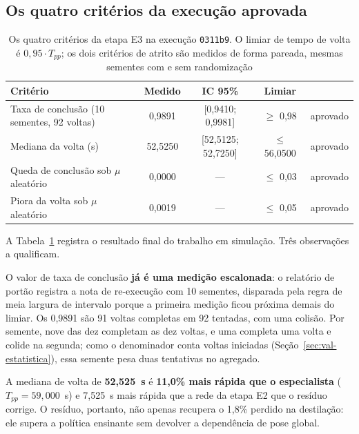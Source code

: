 \subsection{Os quatro critérios da execução aprovada}

\begin{table}[h]
    \centering
    \small
    \begin{tabularx}{\textwidth}{|>{\raggedright\arraybackslash}X|c|c|c|c|}
        \hline
        \textbf{Critério} & \textbf{Medido} & \textbf{IC 95\%} &
        \textbf{Limiar} & \\
        \hline
        Taxa de conclusão (10 sementes, 92 voltas) & 0,9891 &
        [0,9410; 0,9981] & $\geq$ 0,98 & aprovado \\
        \hline
        Mediana da volta (s) & 52,5250 & [52,5125; 52,7250] &
        $\leq$ 56,0500 & aprovado \\
        \hline
        Queda de conclusão sob $\mu$ aleatório & 0,0000 & --- &
        $\leq$ 0,03 & aprovado \\
        \hline
        Piora da volta sob $\mu$ aleatório & 0,0019 & --- & $\leq$ 0,05 &
        aprovado \\
        \hline
    \end{tabularx}
    \caption{Os quatro critérios da etapa E3 na execução \texttt{0311b9}. O
    limiar de tempo de volta é $0{,}95 \cdot T_{pp}$; os dois critérios de
    atrito são medidos de forma pareada, mesmas sementes com e sem randomização}
    \label{tab:res_e3_criterios}
\end{table}

A Tabela~\ref{tab:res_e3_criterios} registra o resultado final do trabalho em
simulação. Três observações a qualificam.

O valor de taxa de conclusão \textbf{já é uma medição escalonada}: o relatório de
portão registra a nota de re-execução com 10 sementes, disparada pela regra de
meia largura de intervalo porque a primeira medição ficou próxima demais do
limiar. Os 0,9891 são 91 voltas completas em 92 tentadas, com uma colisão. Por
semente, nove das dez completam as dez voltas, e uma completa uma volta e colide
na segunda; como o denominador conta voltas iniciadas
(Seção~\ref{sec:val-estatistica}), essa semente pesa duas tentativas no
agregado.

A mediana de volta de \textbf{52,525~s} é \textbf{11,0\% mais rápida que o
especialista} ($T_{pp} = 59{,}000$~s) e 7,525~s mais rápida que a rede da etapa
E2 que o resíduo corrige. O resíduo, portanto, não apenas recupera o 1,8\%
perdido na destilação: ele supera a política ensinante sem devolver a dependência
de pose global.

